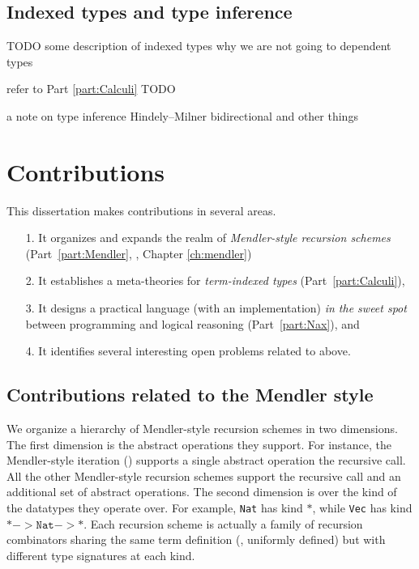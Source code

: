 \subsection{Indexed types and type inference}
\label{sec:intro:indexed}
TODO some description of indexed types
why we are not going to dependent types

refer to Part \ref{part:Calculi}
TODO

a note on type inference
Hindely--Milner
bidirectional and other things

\section{Contributions}\label{sec:intro:contrib}
This dissertation makes contributions in several areas.
\begin{itemize}
\item[1.]
It organizes and expands the realm of \emph{Mendler-style recursion schemes}
(Part~\ref{part:Mendler}, \ie, Chapter \ref{ch:mendler})

\item[2.] It establishes a meta-theories for \emph{term-indexed types}
        (Part~\ref{part:Calculi}),

\item[3.] It designs a practical language (with an implementation)
	\emph{in the sweet spot} between programming and logical reasoning
	(Part~\ref{part:Nax}), and

\item[4.] It identifies several interesting open problems related to above.
\end{itemize}

\subsection{Contributions related to the Mendler style}
We organize a hierarchy of Mendler-style recursion schemes in two dimensions.
The first dimension is the abstract operations they support. For instance,
the Mendler-style iteration (\MIt) supports a single abstract operation
the recursive call. All the other Mendler-style recursion schemes
support the recursive call and an additional set of abstract operations. 
The second dimension is over the kind of the datatypes they operate over.
For example, \texttt{Nat} has kind $*$, while \texttt{Vec}
has kind $* -> \mathtt{Nat} -> *$. Each recursion scheme is actually a
family of recursion combinators sharing the same term definition
(\ie, uniformly defined) but with different type signatures at each kind.

